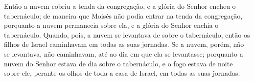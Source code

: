 Então a nuvem cobriu a tenda da congregação, e a glória do Senhor
encheu o tabernáculo; de maneira que Moisés não podia entrar
na tenda da congregação, porquanto a nuvem permanecia sobre ela, e a
glória do Senhor enchia o tabernáculo. Quando, pois, a nuvem
se levantava de sobre o tabernáculo, então os filhos de Israel
caminhavam em todas as suas jornadas. Se a nuvem, porém, não
se levantava, não caminhavam, até ao dia em que ela se levantasse;
porquanto a nuvem do Senhor estava de dia sobre o
tabernáculo, e o fogo estava de noite sobre ele, perante os olhos de
toda a casa de Israel, em todas as suas jornadas.

